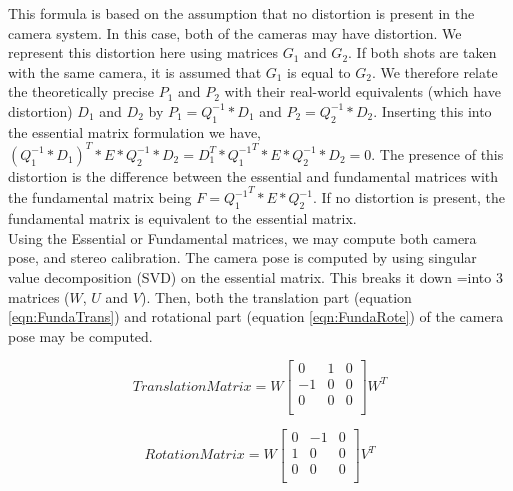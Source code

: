 This formula is based on the assumption that no distortion is present in the camera system. In this case, both of the cameras may have distortion. We represent this distortion here using matrices $G_1$ and $G_2$. If both shots are taken with the same camera, it is assumed that $G_1$ is equal to $G_2$. We therefore relate the theoretically precise $P_1$ and $P_2$ with their real-world equivalents (which have distortion) $D_1$ and $D_2$ by $P_1 = Q_1^{-1} * D_1$ and $P_2 = Q_2^{-1} * D_2$. Inserting this into the essential matrix formulation we have, $(Q_1^{-1} * D_1)^T * E * Q_2^{-1} * D_2 = D_{1}^{T} * {Q_1^{-1}}^{T} * E * Q_2^{-1} * D_2 = 0$. The presence of this distortion is the difference between the essential and fundamental matrices with the fundamental matrix being $F = {Q_1^{-1}}^{T} * E * Q_2^{-1}$. If no distortion is present, the fundamental matrix is equivalent to the essential matrix. \\

Using the Essential or Fundamental matrices, we may compute both camera pose, and stereo calibration. The camera pose is computed by using singular value decomposition (SVD) on the essential matrix. This breaks it down =into 3 matrices ($W$, $U$ and $V$). Then, both the translation part (equation \ref{eqn:FundaTrans}) and rotational part (equation \ref{eqn:FundaRote}) of the camera pose may be computed.

\begin{equation} \label{eqn:FundaTrans}
Translation Matrix = W\left[
\begin{array}{ccc}
0 & 1 & 0 \\
-1 & 0 & 0 \\
0 & 0 & 0 \\
\end{array}
\right]W^{T}
\end{equation}

\begin{equation} \label{eqn:FundaRote}
Rotation Matrix = W\left[
\begin{array}{ccc}
0 & -1 & 0 \\
1 & 0 & 0 \\
0 & 0 & 0 \\
\end{array}
\right]V^{T}
\end{equation}

